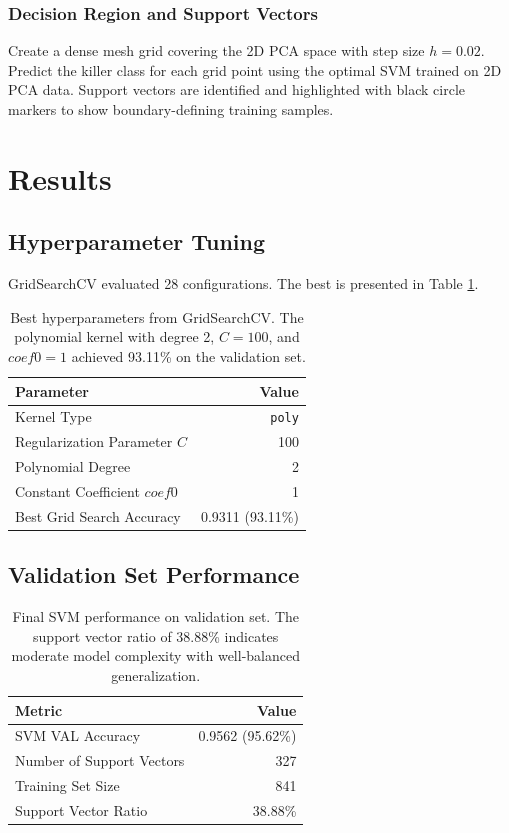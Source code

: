 \documentclass[12pt]{article}
\begin{document}
\subsubsection{Decision Region and Support Vectors}

Create a dense mesh grid covering the 2D PCA space with step size $h = 0.02$. Predict the killer class for each grid point using the optimal SVM trained on 2D PCA data. Support vectors are identified and highlighted with black circle markers to show boundary-defining training samples.

\section{Results}

\subsection{Hyperparameter Tuning}

GridSearchCV evaluated 28 configurations. The best is presented in Table \ref{tab:best_params}.

\begin{table}[h]
\centering
\begin{tabular}{lr}
\toprule
\textbf{Parameter} & \textbf{Value} \\
\midrule
Kernel Type & \texttt{poly} \\
Regularization Parameter $C$ & 100 \\
Polynomial Degree & 2 \\
Constant Coefficient $coef0$ & 1 \\
Best Grid Search Accuracy & 0.9311 (93.11\%) \\
\bottomrule
\end{tabular}
\caption{Best hyperparameters from GridSearchCV. The polynomial kernel with degree 2, $C = 100$, and $coef0 = 1$ achieved 93.11\% on the validation set.}
\label{tab:best_params}
\end{table}

\subsection{Validation Set Performance}

\begin{table}[h]
\centering
\begin{tabular}{lr}
\toprule
\textbf{Metric} & \textbf{Value} \\
\midrule
SVM VAL Accuracy & 0.9562 (95.62\%) \\
Number of Support Vectors & 327 \\
Training Set Size & 841 \\
Support Vector Ratio & 38.88\% \\
\bottomrule
\end{tabular}
\caption{Final SVM performance on validation set. The support vector ratio of 38.88\% indicates moderate model complexity with well-balanced generalization.}
\label{tab:final_perf}
\end{table}
\end{document}
